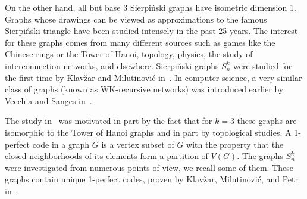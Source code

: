 \documentclass[12pt,a4paper,titlepage,openany]{report}
\begin{document}
On the other hand, all but base 3 Sierpi\'nski graphs have isometric dimension 1. \newline
Graphs whose drawings can be viewed as approximations to the famous Sierpi\'nski triangle have been studied intensely in the past 25 years. The interest for these graphs comes from many different sources such as games like the Chinese rings or the Tower of Hanoi, topology, physics, the study of interconnection networks, and elsewhere.\newline
Sierpi\'nski graphs $S^{k}_n$ were studied for the first time by Klav\v zar and Milutinovi\' c in~\cite{Sandi2}. In computer science, a very similar class of graphs (known as WK-recursive networks) was introduced earlier by Vecchia and Sanges in~\cite{Vecchia}. 

The study in~\cite{Sandi2} was motivated in part by the fact that for $k=3$ these graphs are isomorphic to the Tower of Hanoi graphs and in part by topological studies.\newline
A 1-perfect code in a graph $G$ is a vertex subset of $G$ with the property that the closed neighborhoods of its elements form a partition of $V(G)$. The graphs $S^k_n$ were investigated from numerous points of view, we recall some of them. These graphs contain unique 1-perfect codes, proven by Klav\v zar, Milutinovi\' c, and Petr in~\cite{Ciril}. 
\end{document}
